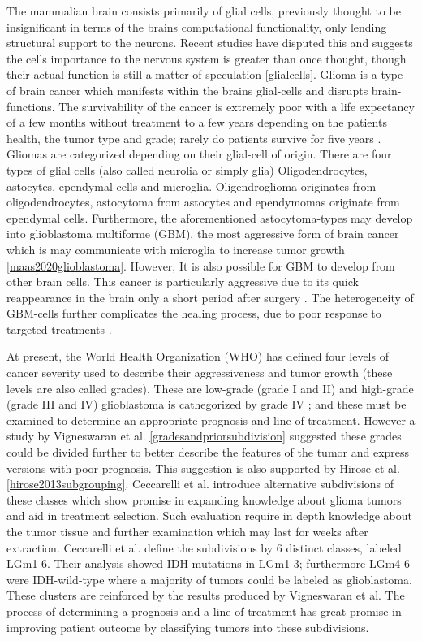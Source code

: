 The mammalian brain consists primarily of glial cells, previously thought to be insignificant in terms of the brains computational functionality, only lending structural support to the neurons. Recent studies have disputed this and suggests the cells importance to the nervous system is greater than once thought, though their actual function is still a matter of speculation \ref{glialcells}. Glioma is a type of brain cancer which manifests within the brains glial-cells and disrupts brain-functions. The survivability of the cancer is extremely poor with a life expectancy of a few months without treatment to a few years depending on the patients health, the tumor type and grade; rarely do patients survive for five years \cite{gallego2015nonsurgical}\cite{bleeker2012recent}. Gliomas are categorized depending on their glial-cell of origin. There are four types of glial cells (also called neurolia or simply glia) Oligodendrocytes, astocytes, ependymal cells and microglia. Oligendroglioma originates from oligodendrocytes, astocytoma from astocytes and ependymomas originate from ependymal cells. Furthermore, the aforementioned astocytoma-types may develop into glioblastoma multiforme (GBM), the most aggressive form of brain cancer which is may communicate with  microglia to increase tumor growth \ref{maas2020glioblastoma}. However, It is also possible for GBM to develop from other brain cells. This cancer is particularly aggressive due to its quick reappearance in the brain only a short period after surgery \cite{gallego2015nonsurgical}. The heterogeneity of GBM-cells further complicates the healing process, due to poor response to targeted treatments \cite{dirkse2019stem}.

At present, the World Health Organization (WHO) has defined four levels of cancer severity used to describe their aggressiveness and tumor growth (these levels are also called grades). These are low-grade (grade I and II) and high-grade (grade III and IV) glioblastoma is cathegorized by grade IV \cite{bleeker2012recent, gradesandpriorsubdivision}; and these must be examined to determine an appropriate prognosis and line of treatment. However a study by Vigneswaran et al. \ref{gradesandpriorsubdivision} suggested these grades could be divided further to better describe the features of the tumor and express versions with poor prognosis. This suggestion is also supported by Hirose et al. \ref{hirose2013subgrouping}. Ceccarelli et al.\cite{cellsubsets} introduce alternative subdivisions of these classes which show promise in expanding knowledge about glioma tumors and aid in treatment selection. Such evaluation require in depth knowledge about the tumor tissue and  further examination which may last for weeks after extraction. Ceccarelli et al. define the subdivisions by 6 distinct classes, labeled LGm1-6. Their analysis showed IDH-mutations in LGm1-3; furthermore LGm4-6 were IDH-wild-type where a majority of tumors could be labeled as glioblastoma. These clusters are reinforced by the results produced by Vigneswaran et al. The process of determining a prognosis and a line of treatment has great promise in improving patient outcome by classifying tumors into these subdivisions.

